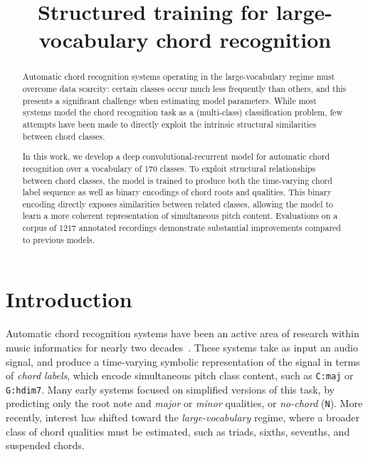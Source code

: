 \documentclass{article}
\title{Structured training for large-vocabulary chord recognition}
\begin{document}
%
\maketitle
%
\begin{abstract}
Automatic chord recognition systems operating in the large-vocabulary regime must overcome data scarcity: certain classes occur much less frequently than others, and this presents a significant challenge when estimating model parameters.
While most systems model the chord recognition task as a (multi-class) classification problem, few attempts have been made to directly exploit the intrinsic structural similarities between chord classes.

In this work, we develop a deep convolutional-recurrent model for automatic chord recognition over a vocabulary of 170 classes.
To exploit structural relationships between chord classes, the model is trained to produce both the time-varying chord label sequence as well as binary encodings of chord roots and qualities.
This binary encoding directly exposes similarities between related classes, allowing the model to learn a more coherent representation of simultaneous pitch content.
Evaluations on a corpus of 1217 annotated recordings demonstrate substantial improvements compared to previous models.
\end{abstract}
%
\section{Introduction}\label{sec:introduction}




Automatic chord recognition systems have been an active area of research within music informatics for nearly two decades~\cite{fujishima1999realtime}.
These systems take as input an audio signal, and produce a time-varying symbolic representation of the signal in terms of \emph{chord labels}, which encode simultaneous pitch class content, such as \texttt{C:maj} or \texttt{G:hdim7}.
Many early systems focused on simplified versions of this task, by predicting only the root note and \emph{major} or \emph{minor} qualities, or \emph{no-chord} (\texttt{N}).
More recently, interest has shifted toward the \emph{large-vocabulary} regime, where a broader class of chord qualities must be estimated, such as triads, sixths, sevenths, and suspended chords.
\end{document}
